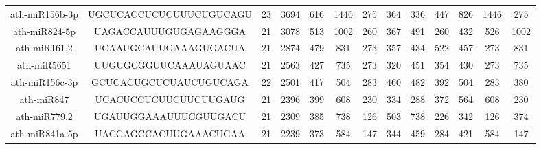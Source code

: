 \begin{landscape}
\begin{table}[]
\begin{tabular}{ccccccccccccc}
    ath-miR156b-3p   & UGCUCACCUCUCUUUCUGUCAGU  & 23           & 3694         & 616              & 1446         & 275                          & 364                  & 336                  & 447                   & 826                   & 1446                  & 275                   \\
    ath-miR824-5p    & UAGACCAUUUGUGAGAAGGGA    & 21           & 3078         & 513              & 1002         & 260                          & 367                  & 491                  & 260                   & 432                   & 526                   & 1002                  \\
    ath-miR161.2     & UCAAUGCAUUGAAAGUGACUA    & 21           & 2874         & 479              & 831          & 273                          & 357                  & 434                  & 522                   & 457                   & 273                   & 831                   \\
    ath-miR5651      & UUGUGCGGUUCAAAUAGUAAC    & 21           & 2563         & 427              & 735          & 273                          & 320                  & 451                  & 354                   & 430                   & 273                   & 735                   \\
    ath-miR156c-3p   & GCUCACUGCUCUAUCUGUCAGA   & 22           & 2501         & 417              & 504          & 283                          & 460                  & 482                  & 392                   & 504                   & 283                   & 380                   \\
    ath-miR847       & UCACUCCUCUUCUUCUUGAUG    & 21           & 2396         & 399              & 608          & 230                          & 334                  & 288                  & 372                   & 564                   & 608                   & 230                   \\
    ath-miR779.2     & UGAUUGGAAAUUUCGUUGACU    & 21           & 2309         & 385              & 738          & 126                          & 503                  & 738                  & 226                   & 342                   & 126                   & 374                   \\
    ath-miR841a-5p   & UACGAGCCACUUGAAACUGAA    & 21           & 2239         & 373              & 584          & 147                          & 344                  & 459                  & 284                   & 421                   & 584                   & 147                   \\

\end{tabular}
\end{table}
\end{landscape}
